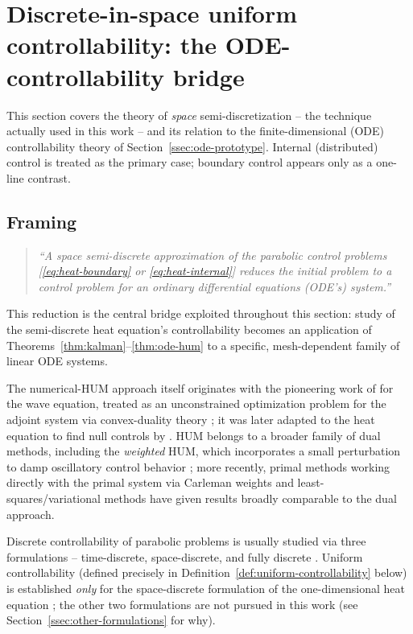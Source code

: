 \section{Discrete-in-space uniform controllability: the ODE-controllability bridge}
\label{sec:discrete}

This section covers the theory of \emph{space} semi-discretization -- the
technique actually used in this work -- and its relation to the
finite-dimensional (ODE) controllability theory of
Section~\ref{ssec:ode-prototype}. Internal (distributed) control is treated
as the primary case; boundary control appears only as a one-line contrast.

\subsection{Framing}
\label{ssec:discrete-framing}

\begin{quote}
  \itshape ``A space semi-discrete approximation of the parabolic control
  problems [\eqref{eq:heat-boundary} or \eqref{eq:heat-internal}] reduces the
  initial problem to a control problem for an ordinary differential equations
  (ODE's) system.''
\end{quote}
This reduction is the central bridge exploited throughout this section: study
of the semi-discrete heat equation's controllability becomes an application of
Theorems~\ref{thm:kalman}--\ref{thm:ode-hum} to a specific, mesh-dependent
family of linear ODE systems.

The numerical-HUM approach itself originates with the pioneering work of
\citet{glowinski1990numerical} for the wave equation, treated as an
unconstrained optimization problem for the adjoint system via convex-duality
theory \citep{ekeland1999convex}; it was later adapted to the heat equation to
find null controls by \citet{carthel1994exact}. HUM belongs to a broader
family of dual methods, including the \emph{weighted} HUM, which incorporates
a small perturbation to damp oscillatory control behavior
\citep{zuazua2006control}; more recently, primal methods working directly
with the primal system via Carleman weights \citep{fernandez2014numerical}
and least-squares/variational methods \citep{munch2014numerical} have given
results broadly comparable to the dual approach.

Discrete controllability of parabolic problems is usually studied via three
formulations -- time-discrete, space-discrete, and fully discrete
\citep{boyer2020carleman}. Uniform controllability (defined precisely in
Definition~\ref{def:uniform-controllability} below) is established
\emph{only} for the space-discrete formulation of the one-dimensional heat
equation \citep{zuazua2006control,lopez1998some}; the other two formulations
are not pursued in this work (see Section~\ref{ssec:other-formulations} for
why).

